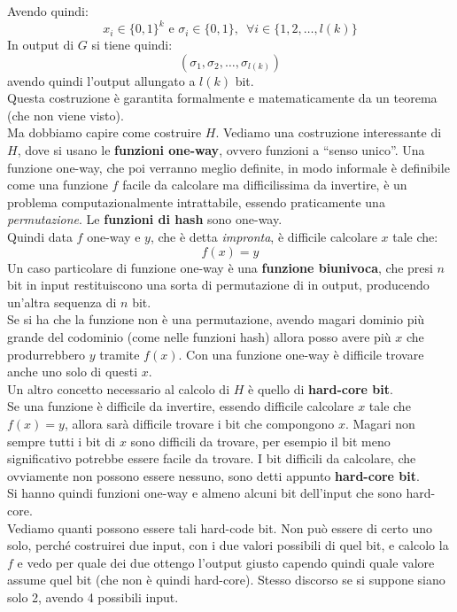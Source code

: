 \documentclass[a4paper,12pt, oneside]{book}
\begin{document}
Avendo quindi:
\[x_i\in\{0,1\}^k\mbox{ e }\sigma_i\in\{0,1\},\,\,\,\forall i\in\{1,2,\ldots,
  l(k)\}\]
In output di $G$ si tiene quindi:
\[(\sigma_1,\sigma_2,\ldots, \sigma_{l(k)})\]
avendo quindi l'output allungato a $l(k)$ bit.\\
Questa costruzione è garantita formalmente e matematicamente da un teorema (che
non viene visto).\\
Ma dobbiamo capire come costruire $H$. Vediamo una costruzione interessante di
$H$, dove si usano le \textbf{funzioni one-way}, ovvero funzioni a ``senso
unico''. Una funzione one-way, che poi verranno meglio definite, in modo
informale è definibile come una funzione $f$ facile da calcolare ma
difficilissima da invertire, è un problema computazionalmente intrattabile,
essendo praticamente una \textit{permutazione}. Le
\textbf{funzioni di hash} sono one-way.\\
Quindi data $f$ one-way e $y$, che è detta \textit{impronta}, è difficile
calcolare $x$ tale che: 
\[f(x)=y\]
Un caso particolare di funzione one-way è una \textbf{funzione biunivoca}, che
presi $n$ bit in input restituiscono una sorta di permutazione di in output,
producendo un'altra sequenza di $n$ bit.\\
Se si ha che la funzione non è una permutazione, avendo magari dominio più
grande del codominio (come nelle funzioni hash) allora posso avere più $x$ che
produrrebbero $y$ tramite $f(x)$. Con una funzione one-way è difficile trovare
anche uno solo di questi $x$.\\
Un altro concetto necessario al calcolo di $H$ è quello di \textbf{hard-core
  bit}. \\
Se una funzione è difficile da invertire, essendo difficile calcolare $x$ tale
che $f(x)=y$, allora sarà difficile trovare i bit che compongono $x$. Magari non
sempre tutti i bit di $x$ sono difficili da trovare, per esempio il bit meno
significativo potrebbe essere facile da trovare. I bit difficili da calcolare,
che ovviamente non possono essere nessuno, sono detti appunto \textbf{hard-core
  bit}. \\
Si hanno quindi funzioni one-way e almeno alcuni bit dell'input che sono
hard-core. \\
Vediamo quanti possono essere tali hard-code bit. Non può essere di certo uno
solo, perché costruirei due input, con i due valori possibili di quel bit, e
calcolo la $f$ e vedo per quale dei due ottengo l'output giusto capendo quindi
quale valore assume quel bit (che non è quindi hard-core). Stesso discorso se si
suppone siano solo 2, avendo 4 possibili input.\\
\end{document}
